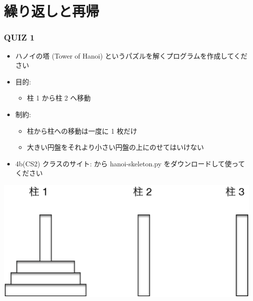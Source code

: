 \section{繰り返しと再帰}
\begin{frame}
\frametitle{QUIZ 1}
  \begin{itemize}
\item ハノイの塔 (Tower of Hanoi) というパズルを解くプログラムを作成してください
\item 目的:
    \begin{itemize}
\item 柱 1 から柱 2 へ移動
    \end{itemize}
\item 制約:
    \begin{itemize}
\item 柱から柱への移動は一度に 1 枚だけ
\item 大きい円盤をそれより小さい円盤の上にのせてはいけない
    \end{itemize}
\item 4b(CS2) クラスのサイト: \href{https://sites.google.com/a/presystems.xyz/sample/home/elementary-computer-science}{} 
から hanoi-skeleton.py をダウンロードして使ってください
  \end{itemize}
  \begin{center}
\includegraphics[scale=0.4]{./Figure/elementaryCS-2nd-figHanoi.eps}
  \end{center}
\end{frame}
